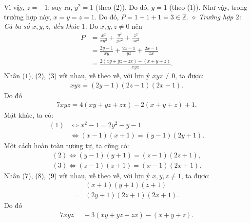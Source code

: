 \begin{multicols}{2}
	Vì vậy, $z = -1$; suy ra, $y^2 = 1$ (theo ($2$)). Do đó, $y = 1$ (theo ($1$)).
	\vskip 0.05cm
	Như vậy, trong trường hợp này, $x \!=\! y \!=\! z \!=\! 1$. Do đó,  $P = 1+ 1+ 1 = 3 \in \mathbb{Z}$.
	\vskip 0.05cm
	$\diamond$ \textit{Trường hợp $2$: Cả ba số $x, y, z$, đều khác $1$.}
	\vskip 0.05cm
	Do $x, y, z \ne 0$ nên
	\begin{align*}
		P &= \frac{{{x^2}}}{{x{y^2}}} + \frac{{{y^2}}}{{y{z^2}}} + \frac{{{z^2}}}{{z{x^2}}} \\
		&= \frac{{2y - 1}}{{xy}} + \frac{{2z - 1}}{{yz}} + \frac{{2x - 1}}{{zx}} \\
		&= \frac{{2\left( {xy + yz + zx} \right) - \left( {x + y + z} \right)}}{{xyz}}. \tag{$5$}
	\end{align*}
	Nhân ($1$), ($2$), ($3$) với nhau, vế theo vế, với lưu ý $xyz \ne 0$, ta được:
	\begin{align*}
		xyz = \left( {2y - 1} \right)\left( {2z - 1} \right)\left( {2x - 1} \right).
	\end{align*}
	Do đó
	\begin{align*}
		7xyz \!=\! 4\!\left( {xy \!+\! yz \!+\! zx} \right) \!-\! 2\!\left( {x \!+\! y \!+\! z} \!\right) \!+\!\! 1. \tag{$6$}
	\end{align*}
	Mặt khác, ta có:
	\begin{align*}
		(1) &\Leftrightarrow {x^2} - 1 = 2{y^2} - y - 1\\
		&\Leftrightarrow\! \left( {x \!-\! 1} \right)\!\left( {x \!+\! 1} \right)\! =\! \left( {y \!-\! 1} \right)\!\left( {2y \!+\! 1} \right). \tag{$7$}
	\end{align*}
	Một cách hoàn toàn tương tự, ta cũng có:
	\begin{align*}
		(2) \!\Leftrightarrow\! \left( {y \!-\! 1} \right)\left( {y \!+\! 1} \right) \!=\! \left( {z \!-\! 1} \right)\left( {2z \!+\! 1} \right), \tag{$8$}\\
		(3) \!\Leftrightarrow\! \left( {z \!-\! 1} \right)\left( {z \!+\! 1} \right) \!=\! \left( {x \!-\! 1} \right)\left( {2x \!+\! 1} \right). \tag{$9$}
	\end{align*}
	Nhân ($7$), ($8$), ($9$) với nhau, vế theo vế, với lưu ý $x, y, z \ne 1$, ta được:
	\begin{align*}
		&\left( {x + 1} \right)\left( {y + 1} \right)\left( {z + 1} \right) \\
		= &\left( {2y + 1} \right)\left( {2z + 1} \right)\left( {2x + 1} \right).
	\end{align*}
	Do đó
	\begin{align*}
		7xyz \!=\!  -\! 3\left( {xy \!+\! yz \!+\! zx} \right) \!-\! \left( {x \!+\! y \!+\! z} \right). \tag{$10$}

\end{align*}
\end{multicols}
